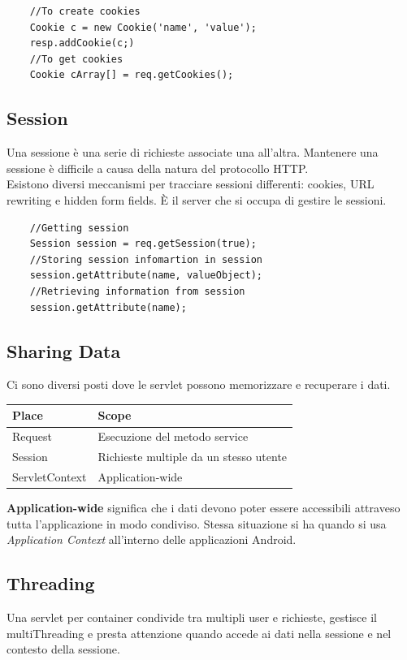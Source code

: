 \begin{lstlisting}
    //To create cookies
    Cookie c = new Cookie('name', 'value');
    resp.addCookie(c;)
    //To get cookies
    Cookie cArray[] = req.getCookies();
\end{lstlisting}


\subsection{Session}
Una sessione è una serie di richieste associate una all’altra. Mantenere una sessione è difficile a causa della natura del protocollo HTTP.\\
Esistono diversi meccanismi per tracciare sessioni differenti: cookies, URL rewriting e hidden form fields. È il server che si occupa di gestire le sessioni.

\begin{lstlisting}
    //Getting session
    Session session = req.getSession(true);
    //Storing session infomartion in session 
    session.getAttribute(name, valueObject);
    //Retrieving information from session
    session.getAttribute(name);
\end{lstlisting}

\subsection{Sharing Data}
Ci sono diversi posti dove le servlet possono memorizzare e recuperare i dati.

\begin{table}[H]
    \centering
    \begin{tabular}{|l|l|}
        \hline
        \textbf{Place} & \textbf{Scope}                         \\ \hline
        Request        & Esecuzione del metodo service          \\ \hline
        Session        & Richieste multiple da un stesso utente \\ \hline
        ServletContext & Application-wide                       \\ \hline
    \end{tabular}
\end{table}
\textbf{Application-wide} significa che i dati devono poter essere accessibili attraveso tutta l'applicazione in modo condiviso. Stessa situazione si ha quando si usa \textit{Application Context} all'interno delle applicazioni Android.

\subsection{Threading}
Una servlet per container condivide tra multipli user e richieste, gestisce il multiThreading e presta attenzione quando accede ai dati nella sessione e nel contesto della sessione.

